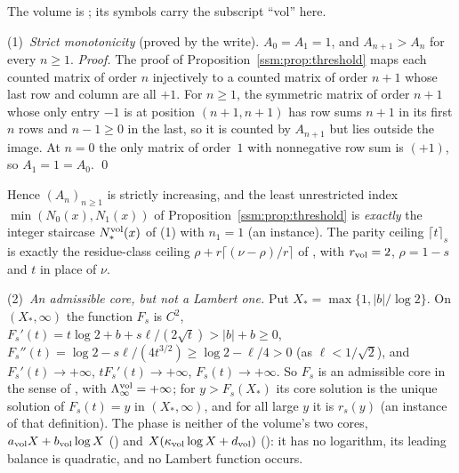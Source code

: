 \begin{remark}\label{ssm:rem:transseries}
The volume is
;
its symbols carry the subscript ``vol'' here.

(1)~\emph{Strict monotonicity} (proved by the write). $A_0=A_1=1$, and
$A_{n+1}>A_n$ for every $n\ge1$. \emph{Proof.} The proof of
Proposition~\ref{ssm:prop:threshold} maps each counted matrix of order $n$
injectively to a counted matrix of order $n+1$ whose last row and column
are all $+1$. For $n\ge1$, the symmetric matrix of order $n+1$ whose only
entry $-1$ is at position $(n+1,n+1)$ has row sums $n+1$ in its first $n$
rows and $n-1\ge0$ in the last, so it is counted by $A_{n+1}$ but lies
outside the image. At $n=0$ the only matrix of order~$1$ with nonnegative
row sum is $(+1)$, so $A_1=1=A_0$. \qed

\noindent Hence $(A_n)_{n\ge1}$ is strictly increasing, and the least
unrestricted index $\min(N_0(x),N_1(x))$ of
Proposition~\ref{ssm:prop:threshold} is \emph{exactly} the integer staircase
$N_\ast^{\rm vol}(x)$ of (1) with $n_1=1$ (an
instance). The parity ceiling $\lceil t\rceil_s$ is exactly the residue-class
ceiling $\rho+r\lceil(\nu-\rho)/r\rceil$ of ,
with $r_{\rm vol}=2$, $\rho=1-s$ and $t$ in place of $\nu$.

(2)~\emph{An admissible core, but not a Lambert one.} Put
$X_\ast=\max\{1,|b|/\log2\}$. On $(X_\ast,\infty)$ the function $F_s$ is
$C^2$, $F_s'(t)=t\log2+b+s\ell/(2\sqrt t)>|b|+b\ge0$,
$F_s''(t)=\log2-s\ell/(4t^{3/2})\ge\log2-\ell/4>0$ (as $\ell<1/\sqrt2$), and
$F_s'(t)\to+\infty$, $tF_s'(t)\to+\infty$, $F_s(t)\to+\infty$. So $F_s$ is
an admissible core in the sense of , with
$\Lambda_\infty^{\rm vol}=+\infty$; for $y>F_s(X_\ast)$ its core solution is
the unique solution of $F_s(t)=y$ in $(X_\ast,\infty)$, and for all large
$y$ it is $r_s(y)$ (an instance of that definition). The phase
is neither of the volume's two cores, $a_{\rm vol}X+b_{\rm vol}\log X$
() and $X(\kappa_{\rm vol}\log X+d_{\rm vol})$
(): it has no logarithm, its leading balance
is quadratic, and no Lambert function occurs.


\end{remark}

